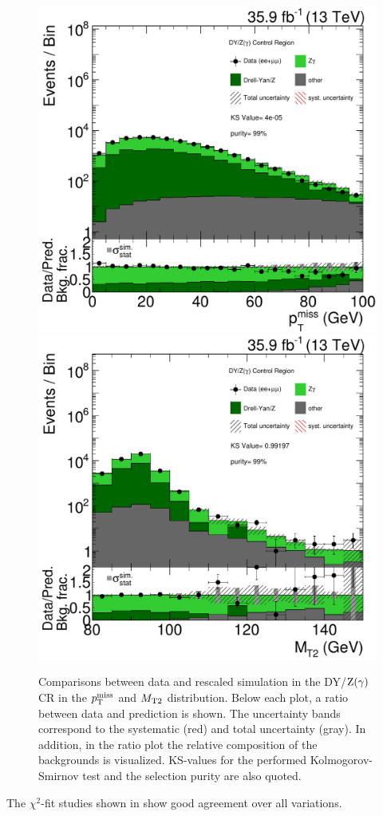 \begin{figure}[tbp]
 \centering
 \includegraphics[width=\pairwidth]{figures/plots_CR_dy/CRDY_LL_nom_met_log2}
 \includegraphics[width=\pairwidth]{figures/plots_CR_dy/CRDY_LL_nom_mt2_log2}
 \caption{Comparisons between data and rescaled simulation in the DY/$\mathrm{Z}(\gamma)$ CR in the $p_{\mathrm{T}}^\text{miss}$ and $M_{\mathrm{T2}}$ distribution. Below each plot, a ratio between data and prediction is shown. The uncertainty bands correspond to the systematic (red) and total uncertainty (gray). In addition, in the ratio plot the relative composition of the backgrounds is visualized. KS-values for the performed Kolmogorov-Smirnov test and the selection purity are also quoted.}
 \label{fig:CRDY}
\end{figure}
The $\chi^2$-fit studies shown in  show good agreement over all variations.

